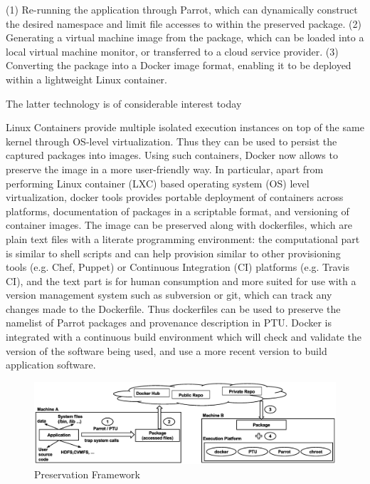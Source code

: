 (1) Re-running the application through Parrot, which can dynamically construct
the desired namespace and limit file accesses to within the preserved package.
(2) Generating a virtual machine image from the package, which can be loaded
into a local virtual machine monitor, or transferred to a cloud service provider.
(3) Converting the package into a Docker image format, enabling it to be
deployed within a lightweight Linux container.

The latter technology is of considerable interest today 

\vspace{5pt}
 Linux Containers provide multiple isolated execution instances on top of the same kernel through OS-level virtualization. Thus they can be used to persist the captured packages into images. Using such containers, Docker now allows to preserve the image in a more user-friendly way. In particular, apart from performing Linux container (LXC) based operating system (OS) level virtualization, docker tools provides portable deployment of containers across platforms, documentation of packages in a scriptable format, and versioning of container images. The image can be preserved along with dockerfiles, which are plain text files with a literate programming environment: the computational part is similar to shell scripts and can help provision similar to other provisioning tools (e.g. Chef, Puppet) or Continuous Integration (CI) platforms (e.g. Travis CI), and the text part is for human consumption and more suited for use with a version management system such as subversion or git, which can track any changes made to the Dockerfile. Thus dockerfiles can be used to preserve the namelist of Parrot packages and provenance description in PTU. 
Docker is integrated with a continuous build environment which will check and validate the version of the software being used, and use a more recent version to build application software. 

\begin{figure}
\centering
\includegraphics[width=1.0\textwidth]{preservation_framework.eps}
\caption{Preservation Framework}
\label{fig: preservation_framework}
\end{figure}

